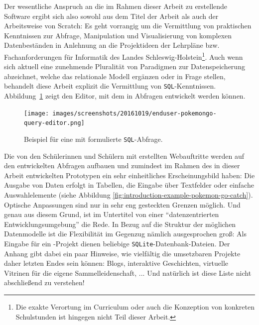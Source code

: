 Der wesentliche Anspruch an die im Rahmen dieser Arbeit zu erstellende Software ergibt sich also sowohl aus dem Titel der Arbeit als auch der Arbeitsweise von Scratch: Es geht vorrangig um die Vermittlung von praktischen Kenntnissen zur Abfrage, Manipulation und Visualisierung von komplexen Datenbeständen in Anlehnung an die Projektideen der Lehrpläne \cite{lehrplan-inf-sek-1} bzw. Fachanforderungen \cite{lehrplan-inf-sek-2} für Informatik des Landes Schleswig-Holstein\footnote{Die exakte Verortung im Curriculum oder auch die Konzeption von konkreten Schulstunden ist hingegen nicht Teil dieser Arbeit.}. Auch wenn sich aktuell eine zunehmende Pluralität von Paradigmen zur Datenspeicherung abzeichnet, welche das relationale Modell ergänzen oder in Frage stellen, behandelt diese Arbeit explizit die Vermittlung von \texttt{SQL}-Kenntnissen. Abbildung~\ref{fig:introduction-example-pokemon-go-query-editor} zeigt den Editor, mit dem in \idename{} Abfragen entwickelt werden können.

\begin{figure}[h]
  \texttt{[image: images/screenshots/20161019/enduser-pokemongo-query-editor.png]}
  \caption{Beispiel für eine mit \idename{} formulierte \texttt{SQL}-Abfrage.}
  \label{fig:introduction-example-pokemon-go-query-editor}
\end{figure}

Die von den Schülerinnen und Schülern mit \idename{} erstellten Webauftritte werden auf den entwickelten Abfragen aufbauen und zumindest im Rahmen des in dieser Arbeit entwickelten Prototypen ein sehr einheitliches Erscheinungsbild haben: Die Ausgabe von Daten erfolgt in Tabellen, die Eingabe über Textfelder oder einfache Auswahlelemente (siehe Abbildung \ref{fig:introduction-example-pokemon-go-catch}). Optische Anpassungen sind nur in sehr eng gesteckten Grenzen möglich. Und genau aus diesem Grund, ist im Untertitel von einer "`datenzentrierten Entwicklungsumgebung"' die Rede. In Bezug auf die Struktur der möglichen Datenmodelle ist die Flexibilität im Gegenzug nämlich ausgesprochen groß: Als Eingabe für ein \idename{}-Projekt dienen beliebige \texttt{SQLite}-Datenbank-Dateien. Der Anhang gibt dabei ein paar Hinweise, wie vielfältig die umsetzbaren Projekte daher letzten Endes sein können: Blogs, interaktive Geschichten, virtuelle Vitrinen für die eigene Sammelleidenschaft, ... Und natürlich ist diese Liste nicht abschließend zu verstehen!

